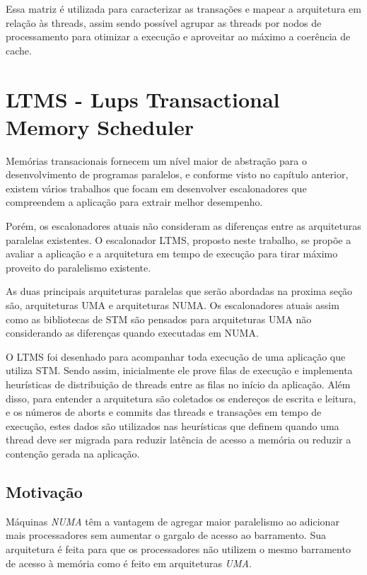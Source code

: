 \documentclass[diss,capa]{texufpel}
\begin{document}
Essa matriz é utilizada para caracterizar as transações e mapear a arquitetura em relação às threads, assim sendo possível agrupar as threads por nodos de processamento para otimizar a execução e aproveitar ao máximo a coerência de cache.

\chapter{LTMS - Lups Transactional Memory Scheduler}
\label{chapter::ltms}

Memórias transacionais fornecem um nível maior de abstração para o desenvolvimento de programas paralelos, e conforme visto no capítulo anterior, existem vários trabalhos que focam em desenvolver escalonadores que compreendem a aplicação para extrair melhor desempenho.

Porém, os escalonadores atuais não consideram as diferenças entre as arquiteturas paralelas existentes. O escalonador LTMS, proposto neste trabalho, se propõe a avaliar a aplicação e a arquitetura em tempo de execução para tirar máximo proveito do paralelismo existente.

As duas principais arquiteturas paralelas que serão abordadas na proxima seção são, arquiteturas UMA e arquiteturas NUMA. Os escalonadores atuais assim como as bibliotecas de STM são pensados para arquiteturas UMA não considerando as diferenças quando executadas em NUMA.

O LTMS foi desenhado para acompanhar toda execução de uma aplicação que utiliza STM. Sendo assim, inicialmente ele prove filas de execução e implementa heurísticas de distribuição de threads entre as filas no início da aplicação. Além disso, para entender a arquitetura são coletados os endereços de escrita e leitura, e os números de aborts e commits das threads e transações em tempo de execução, estes dados são utilizados nas heurísticas que definem quando uma thread deve ser migrada para reduzir latência de acesso a memória ou reduzir a contenção gerada na aplicação.

\section{\textbf{Motivação}}

Máquinas \emph{NUMA} têm a vantagem de agregar maior paralelismo ao adicionar mais processadores sem aumentar o gargalo de acesso ao barramento. Sua arquitetura é feita para que os processadores não utilizem o mesmo barramento de acesso à memória como é feito em arquiteturas \emph{UMA}.
\end{document}
